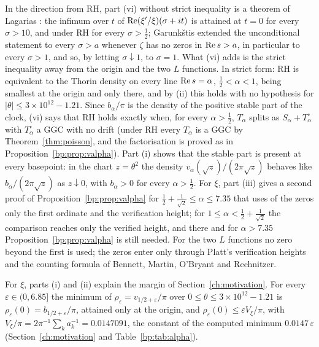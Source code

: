 In the direction from RH, part (vi) without strict inequality is a theorem of Lagarias \cite{Lagarias}: the infimum over $t$ of $\operatorname{Re}(\xi'/\xi)(\sigma+it)$ is attained at $t=0$ for every $\sigma>10$, and under RH for every $\sigma>\frac12$; Garunk\v{s}tis \cite{Garunkstis02} extended the unconditional statement to every $\sigma>a$ whenever $\zeta$ has no zeros in $\operatorname{Re} s>a$, in particular to every $\sigma>1$, and so, by letting $\sigma\downarrow1$, to $\sigma=1$. What (vi) adds is the strict inequality away from the origin and the two $L$ functions. In strict form: RH is equivalent to the Thorin density on every line $\operatorname{Re} s=\alpha$, $\frac12<\alpha<1$, being smallest at the origin and only there, and by (ii) this holds with no hypothesis for $|\theta|\le3\times10^{12}-1.21$. Since $b_\alpha/\pi$ is the density of the positive stable part of the clock, (vi) says that RH holds exactly when, for every $\alpha>\frac12$, $T_\alpha$ splits as $S_\alpha+T_\alpha^\circ$ with $T^\circ_\alpha$ a GGC with no drift (under RH every $T_\alpha$ is a GGC by Theorem~\ref{thm:poisson}, and the factorisation is proved as in Proposition~\ref{bp:prop:valpha}). Part (i) shows that the stable part is present at every basepoint: in the chart $z=\theta^2$ the density $v_\alpha(\sqrt z)/(2\pi\sqrt z)$ behaves like $b_\alpha/(2\pi\sqrt z)$ as $z\downarrow0$, with $b_\alpha>0$ for every $\alpha>\frac12$. For $\xi$, part (iii) gives a second proof of Proposition~\ref{bp:prop:valpha} for $\frac12+\frac1{\sqrt2}\le\alpha\le7.35$ that uses of the zeros only the first ordinate and the verification height; for $1\le\alpha<\frac12+\frac1{\sqrt2}$ the comparison reaches only the verified height, and there and for $\alpha>7.35$ Proposition~\ref{bp:prop:valpha} is still needed. For the two $L$ functions no zero beyond the first is used; the zeros enter only through Platt's verification heights and the counting formula of Bennett, Martin, O'Bryant and Rechnitzer.

\begin{remark}\label{rem:dbeta:margin}
For $\xi$, parts (i) and (ii) explain the margin of Section~\ref{ch:motivation}. For every $\varepsilon\in(0,6.85]$ the minimum of $\rho_\varepsilon=v_{1/2+\varepsilon}/\pi$ over $0\le\theta\le3\times10^{12}-1.21$ is $\rho_\varepsilon(0)=b_{1/2+\varepsilon}/\pi$, attained only at the origin, and $\rho_\varepsilon(0)\le\varepsilon V_\xi/\pi$, with $V_\xi/\pi=2\pi^{-1}\sum_ka_k^{-1}=0.0147091$, the constant of the computed minimum $0.0147\,\varepsilon$ (Section~\ref{ch:motivation} and Table~\ref{bp:tab:alpha}).
\end{remark}

